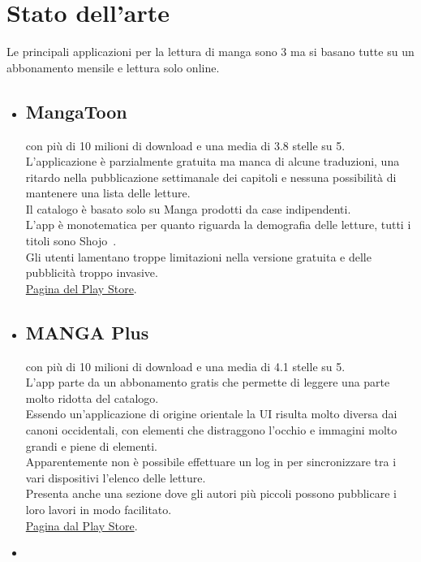 \documentclass[../Assignment-3-LPSMT.tex]{subfiles}
\begin{document}
\chapter{Stato dell'arte}

Le principali applicazioni per la lettura di manga sono 3 ma si basano
tutte su un abbonamento mensile e lettura solo online.

\begin{itemize}
	\item
	      \section{MangaToon} con più di 10 milioni di download e una media di 3.8 stelle su 5.\\
	      L'applicazione è parzialmente gratuita ma manca di alcune traduzioni, una ritardo nella pubblicazione settimanale dei capitoli e nessuna possibilità di mantenere una lista delle letture.\\
	      Il catalogo è basato solo su Manga prodotti da case indipendenti.\\
	      L'app è monotematica per quanto riguarda la demografia delle letture, tutti i titoli sono Shojo~\cite{shooManga}.\\
	      Gli utenti lamentano troppe limitazioni nella versione gratuita e delle pubblicità troppo invasive.\\
	      \href{https://play.google.com/store/apps/details?id=mobi.mangatoon.comics.aphone.spanish}{Pagina del Play Store}.
	\item
	      \section{MANGA Plus}con più di 10 milioni di download e una media di 4.1 stelle su 5.\\
	      L'app parte da un abbonamento gratis che permette di leggere una parte molto ridotta del catalogo.\\
	      Essendo un'applicazione di origine orientale la UI risulta molto diversa dai canoni occidentali, con elementi che distraggono l'occhio e immagini molto grandi e piene di elementi.\\
	      Apparentemente non è possibile effettuare un log in per sincronizzare tra i vari dispositivi l'elenco delle letture.\\
	      Presenta anche una sezione dove gli autori più piccoli possono pubblicare i loro lavori in modo facilitato.\\
	      \href{https://play.google.com/store/apps/details?id=jp.co.shueisha.mangaplus}{Pagina dal Play Store}.
	\item

\end{itemize}
\end{document}
